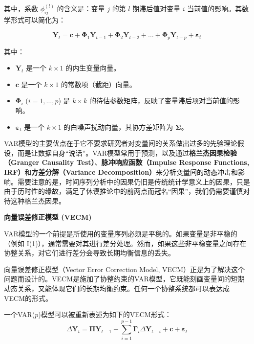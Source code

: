 其中，系数 $\phi_{ij}^{(l)}$ 的含义是：变量 $j$ 的第 $l$ 期滞后值对变量 $i$ 当前值的影响。其数学形式可以简化为：

\begin{equation}
\mathbf{Y}_t = \mathbf{c} + \mathbf{\Phi}_1 \mathbf{Y}_{t-1} + \mathbf{\Phi}_2 \mathbf{Y}_{t-2} + \dots + \mathbf{\Phi}_p \mathbf{Y}_{t-p} + \boldsymbol{\varepsilon}_t
\end{equation}

其中：
\begin{itemize}
    \item $\mathbf{Y}_t$ 是一个 $k \times 1$ 的内生变量向量。
    \item $\mathbf{c}$ 是一个 $k \times 1$ 的常数项（截距）向量。
    \item $\mathbf{\Phi}_i$ ($i=1, \dots, p$) 是 $k \times k$ 的待估参数矩阵，反映了变量滞后项对当前值的影响。
    \item $\boldsymbol{\varepsilon}_t$ 是一个 $k \times 1$ 的白噪声扰动向量，其协方差矩阵为 $\mathbf{\Sigma}$。
\end{itemize}

VAR模型的主要优点在于它不要求研究者对变量间的关系做出过多的先验理论假设，而是让数据自身“说话”。VAR模型常用于预测，以及通过\textbf{格兰杰因果检验（Granger Causality Test）}、\textbf{脉冲响应函数（Impulse Response Functions, IRF）}和\textbf{方差分解（Variance Decomposition）}来分析变量间的动态冲击和影响。需要注意的是，时间序列分析中的因果仍旧是传统统计学意义上的因果，只是由于历时性的缘故，满足了休谟推论中的前两点而冠名“因果”，我们仍需要谨慎对待这种格兰杰因果。

\textbf{向量误差修正模型 (VECM)}

VAR模型的一个前提是所使用的变量序列必须是平稳的。如果变量是非平稳的（例如 I(1)），通常需要对其进行差分处理。然而，如果这些非平稳变量之间存在协整关系，对它们进行差分会导致长期均衡信息的丢失。

向量误差修正模型（Vector Error Correction Model, VECM）正是为了解决这个问题而设计的。VECM是施加了协整约束的VAR模型，它既能刻画变量间的短期动态关系，又能体现它们的长期均衡约束。任何一个协整系统都可以表达成VECM的形式。

一个VAR($p$)模型可以被重新表述为如下的VECM形式：
\begin{equation}
\Delta \mathbf{Y}_t = \mathbf{\Pi} \mathbf{Y}_{t-1} + \sum_{i=1}^{p-1} \mathbf{\Gamma}_i \Delta \mathbf{Y}_{t-i} + \mathbf{c} + \boldsymbol{\varepsilon}_t
\end{equation}

